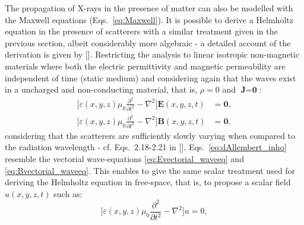 \begin{refsection}
The propagation of X-rays in the presence of matter can also be modelled with the Maxwell equations (Eqs.~\ref{eq:Maxwell}). It is possible to derive a Helmholtz equation in the presence of scatterers with a similar treatment given in the previous section, albeit considerably more algebraic - a detailed account of the derivation is given by [\cite[\textit{§2.1}]{Paganin2006}]. Restricting the analysis to linear isotropic non-magnetic materials where both the electric permittivity and magnetic permeability are independent of time (static medium) and considering again that the waves exist in a uncharged and non-conducting material,  that is, $\rho=0$ and $\textbf{J}=\textbf{0}$:
\begin{subequations}\label{eq:dAllembert_inho}
    \begin{align}
        \Bigg[\varepsilon(x,y,z)\mu_0\frac{\partial^2}{\partial t^2} - \nabla^2 \Bigg]\textbf{E}(x,y,z,t) &= \textbf{0}, \\
        \Bigg[\varepsilon(x,y,z)\mu_0\frac{\partial^2}{\partial t^2} - \nabla^2 \Bigg]\textbf{B}(x,y,z,t) &=\textbf{0}.
    \end{align}
\end{subequations}{}
considering that the scatterers are sufficiently slowly varying when compared to the radiation wavelength - cf. Eqs.~2.18-2.21 in [\cite{Paganin2006}]. Eqs.~\ref{eq:dAllembert_inho} resemble the vectorial wave-equations \ref{eq:Evectorial_waveeq} and \ref{eq:Bvectorial_waveeq}. This enables to give the same scalar treatment used for deriving the Helmholtz equation in free-space, that is, to propose a scalar field $u(x,y,z,t)$ such as:
\begin{equation}\label{eq:Scalar_WE_inho}
    \Bigg[\varepsilon(x,y,z)\mu_0\frac{\partial^2}{\partial t^2} - \nabla^2\Bigg]u=0,

\end{equation}
\end{refsection}

